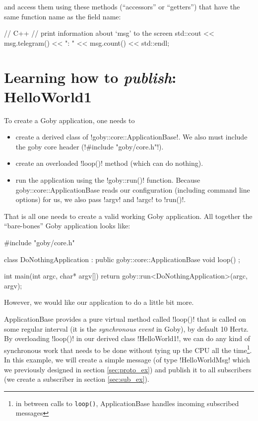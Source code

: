 and access them using these methods (``accessors'' or ``getters'') that have the same function name as the field name:

\begin{boxedverbatim}
// C++ 
// print information about `msg' to the screen
std::cout << msg.telegram() << ": " << msg.count() << std::endl;
\end{boxedverbatim}
\resetbvlinenumber


\section{Learning how to \textit{publish}: HelloWorld1}

To create a Goby application, one needs to

\begin{itemize}
\item create a derived class of !goby::core::ApplicationBase!. We also must include the goby core header (!#include "goby/core.h"!).
\item create an overloaded !loop()! method (which can do nothing).
\item run the application using the !goby::run()! function. Because goby::core::ApplicationBase reads our configuration (including command line options) for us, we also pass !argv! and !argc! to !run()!.
\end{itemize}

That is all one needs to create a valid working Goby application. All together the ``bare-bones'' Goby application looks like:

\begin{boxedverbatim}
#include "goby/core.h"

class DoNothingApplication : public goby::core::ApplicationBase 
{
  void loop() {}
};

int main(int argc, char* argv[])
{   
    return goby::run<DoNothingApplication>(argc, argv);
}
\end{boxedverbatim}
\resetbvlinenumber

However, we would like our application to do a little bit more.

ApplicationBase provides a pure \gls{virtual} method called !loop()! that is called on some regular interval (it is the \textit{\gls{synchronous} event} in Goby), by default 10 Hertz. By overloading !loop()! in our derived class !HelloWorld1!, we can do any kind of synchronous work that needs to be done without tying up the CPU all the time\footnote{in between calls to \texttt{loop()}, ApplicationBase handles incoming subscribed messages}. In this example, we will create a simple message (of type !HelloWorldMsg! which we previously designed in section \ref{sec:proto_ex}) and publish it to all subscribers (we create a subscriber in section \ref{sec:sub_ex}). 

